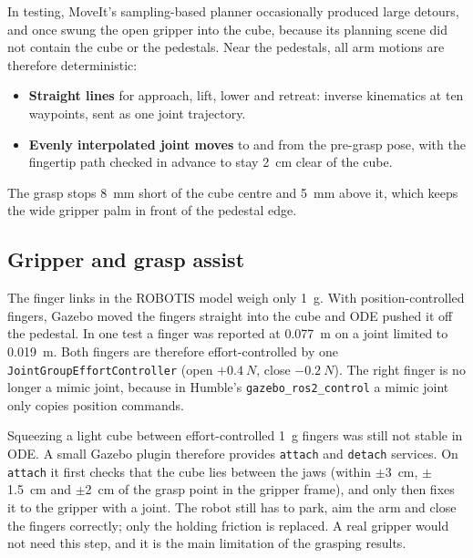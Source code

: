 \documentclass[journal]{IEEEtran}
\begin{document}
In testing, MoveIt's sampling-based planner occasionally produced large detours, and once swung the open gripper into the cube, because its planning scene did not contain the cube or the pedestals. Near the pedestals, all arm motions are therefore deterministic:
\begin{itemize}
  \item \textbf{Straight lines} for approach, lift, lower and retreat: inverse kinematics at ten waypoints, sent as one joint trajectory.
  \item \textbf{Evenly interpolated joint moves} to and from the pre-grasp pose, with the fingertip path checked in advance to stay \SI{2}{cm} clear of the cube.
\end{itemize}
The grasp stops \SI{8}{mm} short of the cube centre and \SI{5}{mm} above it, which keeps the wide gripper palm in front of the pedestal edge.

\subsection{Gripper and grasp assist}
\label{sec:grasp}
The finger links in the ROBOTIS model weigh only \SI{1}{g}. With position-controlled fingers, Gazebo moved the fingers straight into the cube and ODE pushed it off the pedestal. In one test a finger was reported at \SI{0.077}{m} on a joint limited to \SI{0.019}{m}. Both fingers are therefore effort-controlled by one \texttt{JointGroupEffortController} (open $+\SI{0.4}{N}$, close $-\SI{0.2}{N}$). The right finger is no longer a mimic joint, because in Humble's \texttt{gazebo\_ros2\_control} a mimic joint only copies position commands.

Squeezing a light cube between effort-controlled \SI{1}{g} fingers was still not stable in ODE. A small Gazebo plugin therefore provides \texttt{attach} and \texttt{detach} services. On \texttt{attach} it first checks that the cube lies between the jaws (within $\pm$\SI{3}{cm}, $\pm$\SI{1.5}{cm} and $\pm$\SI{2}{cm} of the grasp point in the gripper frame), and only then fixes it to the gripper with a joint. The robot still has to park, aim the arm and close the fingers correctly; only the holding friction is replaced. A real gripper would not need this step, and it is the main limitation of the grasping results.
\end{document}
